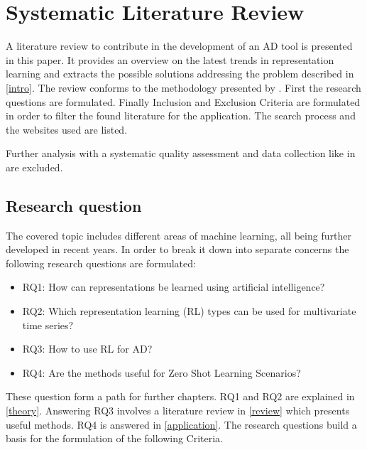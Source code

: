 \section{Systematic Literature Review}\label{methods}
A literature review to contribute in the development of an AD tool is presented in this paper. It provides an overview on the latest trends in representation learning and extracts the possible solutions addressing the problem described in \autoref{intro}. The review conforms to the methodology presented by \cite{kitchenham_systematic_2009}. First the research questions are formulated. Finally Inclusion and Exclusion Criteria are formulated in order to filter the found literature for the application. The search process and the websites used are listed.

Further analysis with a systematic quality assessment and data collection like in \cite{kitchenham_systematic_2009} are excluded.
\subsection{Research question}
The covered topic includes different areas of machine learning, all being further developed in recent years.
In order to break it down into separate concerns the following research questions are formulated:
\begin{itemize}
  \item RQ1: How can representations be learned using artificial intelligence?
  \item RQ2: Which representation learning (RL) types can be used for multivariate time series?
  \item RQ3: How to use RL for AD?
  \item RQ4: Are the methods useful for Zero Shot Learning Scenarios?
\end{itemize}
These question form a path for further chapters. RQ1 and RQ2 are explained in \autoref{theory}. Answering RQ3 involves a literature review in \autoref{review} which presents useful methods. RQ4 is answered in \autoref{application}. The research questions build a basis for the formulation of the following Criteria.
